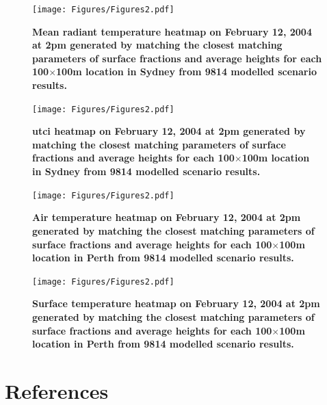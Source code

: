 \documentclass[final,3p,times,authoryear]{elsarticle}
\begin{document}
\begin{figure}
\centering
\texttt{[image: Figures/Figures2.pdf]}
\caption{\bf Mean radiant temperature heatmap on February 12, 2004 at 2pm generated by matching the closest matching parameters of surface fractions and average heights for each 100$\times$100m location in Sydney from 9814 modelled scenario results.  }
 \label{fig:TmrtSyd}
\end{figure}

\begin{figure}
\centering
\texttt{[image: Figures/Figures2.pdf]}
\caption{\bf \gls{utci} heatmap on February 12, 2004 at 2pm generated by matching the closest matching parameters of surface fractions and average heights for each 100$\times$100m location in Sydney from 9814 modelled scenario results.  }
 \label{fig:utciSyd}
\end{figure}

\begin{figure}
\centering
\texttt{[image: Figures/Figures2.pdf]}
\caption{\bf Air temperature heatmap on February 12, 2004 at 2pm generated by matching the closest matching parameters of surface fractions and average heights for each 100$\times$100m location in Perth from 9814 modelled scenario results.  }
 \label{fig:TaPerth}
\end{figure}

\begin{figure}
\centering
\texttt{[image: Figures/Figures2.pdf]}
\caption{\bf Surface temperature heatmap on February 12, 2004 at 2pm generated by matching the closest matching parameters of surface fractions and average heights for each 100$\times$100m location in Perth from 9814 modelled scenario results.  }
 \label{fig:TsfcPerth}
\end{figure}

\printglossaries

\section*{References}\label{sec:ref}

   
   
\end{document}
